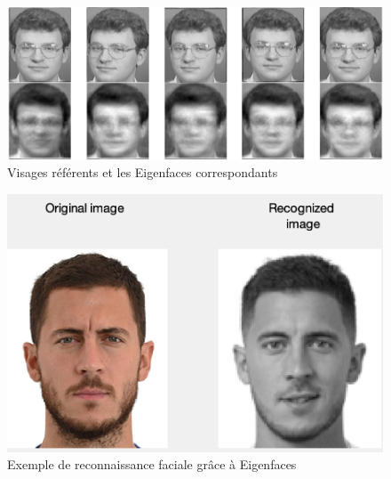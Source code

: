 \documentclass[12pt,a4paper]{article}
\begin{document}
\begin{figure}[H]
\centering
\includegraphics[scale=0.3]{img/eigenfaces.png}
\caption{Visages référents et les Eigenfaces correspondants}
\end{figure}


\begin{figure}[H]
\centering
\includegraphics[scale=0.5]{img/recognition.png}
\caption{Exemple de reconnaissance faciale grâce à Eigenfaces}
\end{figure}
\end{document}
